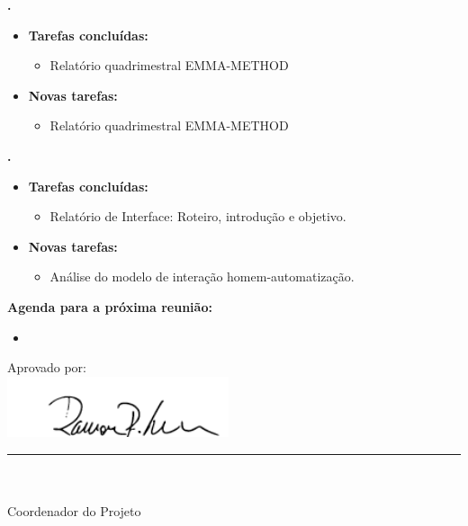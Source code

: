   \textbf{\renan.} 
	\begin{itemize}
		\item \textbf{Tarefas concluídas:}
			\begin{itemize}    
				\item Relatório quadrimestral EMMA-METHOD
			\end{itemize}
		
		\item \textbf{Novas tarefas:}
			\begin{itemize} 
				\item Relatório quadrimestral EMMA-METHOD
			\end{itemize}
	\end{itemize}	
			
   \textbf{\julia.} 
	\begin{itemize}
		\item \textbf{Tarefas concluídas:}
			\begin{itemize}    
				\item Relatório de Interface: Roteiro, introdução e objetivo.
			\end{itemize}
		
		\item \textbf{Novas tarefas:}
			\begin{itemize} 
			    \item Análise do modelo de interação homem-automatização.
			\end{itemize}
	\end{itemize}		



\textbf{Agenda para a próxima reunião:}
  \begin{itemize}
    \item 
  \end{itemize}


\vspace{5mm}%
\parbox[t]{70mm}{
  Aprovado por: \\[5mm]
  \centering
  \includegraphics[width=65mm]{figs/logo/assinatura-ramon.png} \\[-4mm]
  \rule[2mm]{70mm}{0.1mm} \\
  \ramon \\[1mm]
  Coordenador do Projeto \\
}

\fim